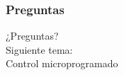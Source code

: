 \documentclass{beamer}
\begin{document}
 
\begin{frame}
	\frametitle{Preguntas}
	\vfill
	\begin{center}
	¿Preguntas?\\
	\vfill
	Siguiente tema: \\
	Control microprogramado
	\end{center}
\end{frame}
\end{document}
